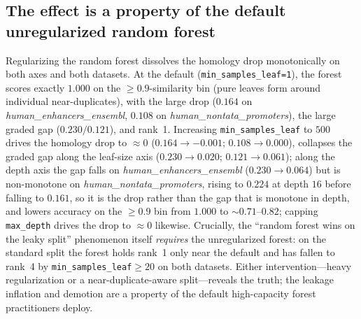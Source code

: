 \documentclass[webpdf,modern,large,namedate]{oup-authoring-template}%
\begin{document}
\subsection{The effect is a property of the default unregularized random forest}\label{sec:r-regpath}
Regularizing the random forest dissolves the homology drop monotonically on both axes and both datasets. At the default (\texttt{min\_samples\_leaf=1}), the forest scores exactly $1.000$ on the $\ge0.9$-similarity bin (pure leaves form around individual near-duplicates), with the large drop ($0.164$ on \textit{human\_enhancers\_ensembl}, $0.108$ on \textit{human\_nontata\_promoters}), the large graded gap ($0.230/0.121$), and rank~1. Increasing \texttt{min\_samples\_leaf} to $500$ drives the homology drop to $\approx0$ ($0.164\to-0.001$; $0.108\to0.000$), collapses the graded gap along the leaf-size axis ($0.230\to0.020$; $0.121\to0.061$); along the depth axis the gap falls on \textit{human\_enhancers\_ensembl} ($0.230\to0.064$) but is non-monotone on \textit{human\_nontata\_promoters}, rising to $0.224$ at depth $16$ before falling to $0.161$, so it is the drop rather than the gap that is monotone in depth, and lowers accuracy on the $\ge0.9$ bin from $1.000$ to $\sim0.71$--$0.82$; capping \texttt{max\_depth} drives the drop to $\approx0$ likewise. Crucially, the ``random forest wins on the leaky split'' phenomenon itself \emph{requires} the unregularized forest: on the standard split the forest holds rank~1 only near the default and has fallen to rank~4 by \texttt{min\_samples\_leaf}$\ge20$ on both datasets. Either intervention---heavy regularization or a near-duplicate-aware split---reveals the truth; the leakage inflation and demotion are a property of the default high-capacity forest practitioners deploy.
\end{document}
